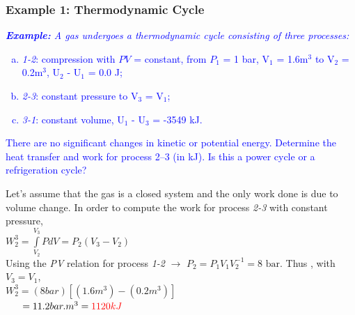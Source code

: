 \documentclass[10pt,compress,handout,ignorenonframetext]{beamer}
\begin{document}

\begin{frame}
 \frametitle{Example 1: Thermodynamic Cycle}
   \textcolor{blue}{{\it {\bf Example:} A gas undergoes a thermodynamic cycle consisting of three processes: 
   \begin{enumerate}[(a)]
    \item \textcolor{blue}{{\it 1-2}: compression with $PV$ = constant, from $P_{1}$ = 1 bar, V$_{1}$ = 1.6m$^{3}$ to V$_{2}$ = 0.2m$^{3}$, U$_{2}$ - U$_{1}$ = 0.0 J;}
    \item \textcolor{blue}{{\it 2-3}: constant pressure to V$_{3}$ = V$_{1}$;}
    \item \textcolor{blue}{{\it 3-1}: constant volume, U$_{1}$ - U$_{3}$ = -3549 kJ.}
   \end{enumerate}
   There are no significant changes in kinetic or potential energy. Determine the heat transfer and work for process 2–3 (in kJ). Is this a power cycle or a refrigeration cycle?}}

   Let's assume that the gas is a closed system and the only work done is due to volume change. In order to compute the work for process {\it 2-3} with constant pressure,\\
    $W_{2}^{3} = \int\limits_{V_{2}}^{V_{3}} P dV = P_{2}\left(V_{3}-V_{2}\right)$\\
   Using the {\it PV} relation for process {\it 1-2} $\rightarrow$ $P_{2}=P_{1}V_{1}V_{2}^{-1}=8\text{ bar}$. Thus , with $V_{3}=V_{1}$,\\
   $W_{2}^{3} = ( 8 bar ) \left[ \left( 1.6m^{3}\right) - \left( 0.2m^{3}\right) \right]$\\
   $\;\;\;\;\;\; = 11.2 bar.m^{3} = \textcolor{red}{1120 kJ}$
 \normalsize
\end{frame}
\end{document}
